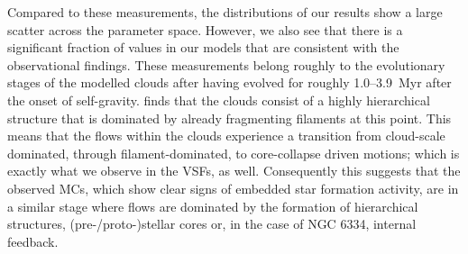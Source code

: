 Compared to these measurements, the distributions of our results show a large scatter across the parameter space. 
However, we also see that there is a significant fraction of values in our models that are consistent with the observational findings. 
These measurements belong roughly to the evolutionary stages of the modelled clouds after having evolved for roughly 1.0--3.9~Myr after the onset of self-gravity.
 finds that the clouds consist of a highly hierarchical structure that is dominated by already fragmenting filaments at this point.
This means that the flows within the clouds experience a transition from cloud-scale dominated, through filament-dominated, to core-collapse driven motions; which is exactly what we observe in the VSFs, as well.
Consequently this suggests that the observed MCs, which show clear signs of embedded star formation activity, are in a similar stage where flows are dominated by the formation of hierarchical structures, (pre-/proto-)stellar cores or, in the case of NGC 6334, internal feedback.


